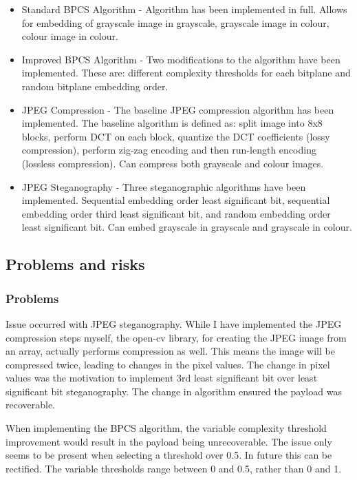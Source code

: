 \documentclass[11pt]{article}
\begin{document}
\begin{itemize}
    \item Standard BPCS Algorithm - Algorithm has been implemented in full. Allows for embedding of grayscale image in grayscale, grayscale image in colour, colour image in colour.
    \item Improved BPCS Algorithm - Two modifications to the algorithm have been implemented. These are: different complexity thresholds for each bitplane and random bitplane embedding order. 
    \item JPEG Compression - The baseline JPEG compression algorithm has been implemented. The baseline algorithm is defined as: split image into 8x8 blocks, perform DCT on each block, quantize the DCT coefficients (lossy compression), perform zig-zag encoding and then run-length encoding (lossless compression). Can compress both grayscale and colour images. 
    \item JPEG Steganography - Three steganographic algorithms have been implemented. Sequential embedding order least significant bit, sequential embedding order third least significant bit, and random embedding order least significant bit. Can embed grayscale in grayscale and grayscale in colour.
\end{itemize}


\subsection{Problems and risks}\label{problems-and-risks}

\subsubsection{Problems}\label{problems}

Issue occurred with JPEG steganography. While I have implemented the JPEG compression steps myself, the open-cv library, for creating the JPEG image from an array, actually performs compression as well. This means the image will be compressed twice, leading to changes in the pixel values. The change in pixel values was the motivation to implement 3rd least significant bit over least significant bit steganography. The change in algorithm ensured the payload was recoverable. 

When implementing the BPCS algorithm, the variable complexity threshold improvement would result in the payload being unrecoverable. The issue only seems to be present when selecting a threshold over 0.5. In future this can be rectified. The variable thresholds range between 0 and 0.5, rather than 0 and 1. 
\end{document}
